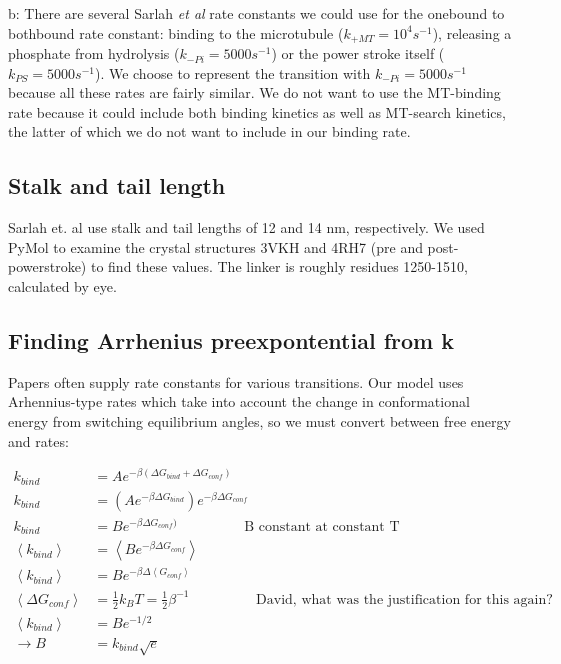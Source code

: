 \documentclass[10pt]{article} %
\begin{document}
b: There are several Sarlah \textit{et al} rate constants we could use for the onebound to bothbound rate constant: binding to the microtubule ($k_{+MT} = 10^4 s^{-1}$), releasing a phosphate from hydrolysis ($k_{-Pi} = 5000 s^{-1}$) or the power stroke itself ($k_{PS} = 5000 s^{-1}$). We choose to represent the transition with $k_{-Pi} = 5000 s^{-1}$ because all these rates are fairly similar. We do not want to use the MT-binding rate because it could include both binding kinetics as well as MT-search kinetics, the latter of which we do not want to include in our binding rate.\\

\subsection{Stalk and tail length}
Sarlah et. al use stalk and tail lengths of 12 and 14 nm, respectively. We used PyMol to examine the crystal structures 3VKH and 4RH7 (pre and post-powerstroke) to find these values. The linker is roughly residues 1250-1510, calculated by eye.\\

\subsection{Finding Arrhenius preexpontential from k}
Papers often supply rate constants for various transitions. Our model uses Arhennius-type rates which take into account the change in conformational energy from switching equilibrium angles, so we must convert between free energy and rates:

\begin{align*}
  k_{bind} &= Ae^{-\beta(\Delta G_{bind} + \Delta G_{conf})}\\
  k_{bind} &= \left(Ae^{-\beta\Delta G_{bind}}\right)e^{-\beta\Delta G_{conf}}\\
  k_{bind} &= Be^{-\beta\Delta G_{conf})}\hspace{2cm}\mbox{B constant at constant T}\\
  \left<k_{bind}\right> &= \left<Be^{-\beta\Delta G_{conf}}\right>\\
  \left<k_{bind}\right> &= Be^{-\beta\Delta \left<G_{conf}\right>}\\
  \left<\Delta G_{conf}\right> &= \frac{1}{2}k_BT = \frac12\beta^{-1}\hspace{2cm}\mbox{David, what was the justification for this again?}\\
  \left<k_{bind}\right> &= Be^{-1/2}\\
  \rightarrow B &= k_{bind}\sqrt{e}
\end{align*}
\end{document}
